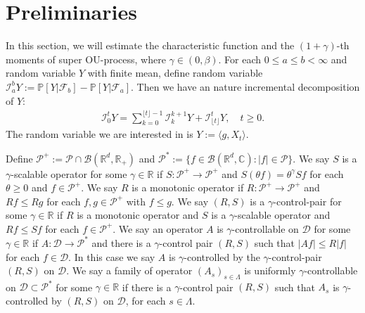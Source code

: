 \documentclass[12pt,oneside,english]{amsart}
\theoremstyle{plain}
\theoremstyle{definition}
\numberwithin{equation}{section}
\begin{document}
\section{Preliminaries}
    In this section, we will estimate the characteristic function and the $(1+\gamma)$-th moments of super OU-process, where $\gamma \in (0,\beta)$.
	For each $0 \leq a \leq b <\infty$ and  random variable $Y$ with finite mean, define random variable
$
   	\mathcal I_a^b Y
    := \mathbb P[Y|\mathscr F_b] - \mathbb P[Y|\mathscr F_a].
$
	Then we have an nature incremental decomposition of $Y$:
\begin{align}
    \mathcal I_0^t Y
    = \sum_{k = 0}^{\lfloor t \rfloor - 1} \mathcal I_k^{k+1}Y + \mathcal I_{\lfloor t \rfloor}^t Y,
    \quad t\geq 0.
\end{align}
	The random variable we are interested in is $Y:= \langle g,X_t\rangle$.
\begin{comment}

\deleted{	
	In this case we have
\begin{align}
    I_a^b[\langle g,X_t\rangle]
    = I_a^b\big[\mathbb P[\langle g,X_t\rangle|\mathscr F_b]\big]
    = I_a^b[ \langle T_{t-b}^\alpha g, X_b \rangle ].
\end{align}
}
\end{comment}
    Define $\mathcal P^+:= \mathcal P \cap \mathcal B(\mathbb R^d, \mathbb R_+)$ and $\mathcal P^*:= \{f\in \mathscr B(\mathbb R^d, \mathbb C): |f|\in \mathcal P\}$.
    We say $S$ is a $\gamma$-scalable operator for some $\gamma\in \mathbb R$ if $S: \mathcal P^+ \to \mathcal P^+$ and $S(\theta f) = \theta^\gamma Sf$ for each $\theta \geq 0$ and $f \in \mathcal P^+$.
    We say $R$ is a monotonic operator if $R:\mathcal P^+ \to \mathcal P^+$ and $Rf \leq Rg$ for each $f, g \in \mathcal P^+$ with $f\leq g$.
    We say $(R,S)$ is a $\gamma$-control-pair for some $\gamma \in \mathbb R$ if $R$ is a monotonic operator and $S$ is a $\gamma$-scalable operator and $Rf\leq Sf$ for each $f\in \mathcal P^+$.
    We say an operator $A$ is $\gamma$-controllable on $\mathcal D $ for some $\gamma \in \mathbb R$ if $A: \mathcal D \to \mathcal P^*$ and there  is a $\gamma$-control pair $(R,S)$ such that $|Af|\leq R|f|$ for each $f\in \mathcal D$.
    In this case we say $A$ is $\gamma$-controlled by the $\gamma$-control-pair $(R,S)$ on $\mathcal D$.
    We say a family of operator $(A_s)_{s\in \Lambda}$ is uniformly $\gamma$-controllable on $\mathcal D\subset \mathcal P^*$ for some $\gamma \in \mathbb R$ if there is a $\gamma$-control pair $(R,S)$ such that $A_s$ is $\gamma$-controlled by $(R, S)$ on $\mathcal D$, for each $s\in \Lambda$.
\end{document}
